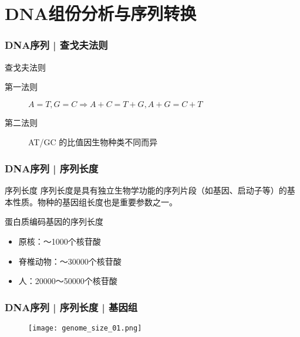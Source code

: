 \section{DNA组份分析与序列转换}
\begin{frame}
  \frametitle{DNA序列 | 查戈夫法则}
  \begin{block}{查戈夫法则}
    \begin{description}
      \item[第一法则]$A=T, G=C \Longrightarrow A+C=T+G, A+G=C+T$
      \item[第二法则]AT/GC 的比值因生物种类不同而异
    \end{description}
  \end{block}
\end{frame}

\begin{frame}
  \frametitle{DNA序列 | 序列长度}
  \begin{block}{序列长度}
    序列长度是具有独立生物学功能的序列片段（如基因、启动子等）的基本性质。物种的基因组长度也是重要参数之一。 
  \end{block}
  \pause
  \begin{block}{蛋白质编码基因的序列长度}
    \begin{itemize}
      \item 原核：～1000个核苷酸
      \item 脊椎动物：～30000个核苷酸
      \item 人：20000～50000个核苷酸
    \end{itemize}
  \end{block}
\end{frame}

\begin{frame}
  \frametitle{DNA序列 | 序列长度 | 基因组}
  \begin{figure}
    \centering
    \texttt{[image: genome\_size\_01.png]}
  \end{figure}
\end{frame}

